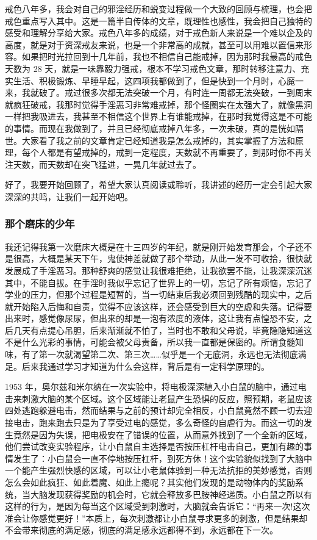 戒色八年多，我会对自己的邪淫经历和蜕变过程做一个大致的回顾与梳理，也会把戒色重点写入其中。这是一篇半自传体的文章，既理性也感性，我会把自己独特的感受和理解分享给大家。戒色八年多的成绩，对于戒色新人来说是一个难以企及的高度，就是对于资深戒友来说，也是一个非常高的成就，甚至可以用难以置信来形容。如果把时光拉回到十几年前，我也不相信自己能戒掉，因为那时我最高的戒色天数为 28 天，就是一味靠毅力强戒，根本不学习戒色文章，那时转移注意力、充实生活、积极锻炼、早睡早起，这四项我都做到了，但是快到一个月时，心魔一来，我就破了。戒过很多次都无法突破一个月，有时连一周都无法突破，一到周末就疯狂破戒，我那时觉得手淫恶习非常难戒掉，那个怪圈实在太强大了，就像黑洞一样把我吸进去，我甚至不相信这个世界上有谁能戒掉，在那时我觉得这是不可能的事情。而现在我做到了，并且已经彻底戒掉八年多，一次未破，真的是恍如隔世。大家看了我之前的文章肯定已经知道我是怎么戒掉的，其实掌握了方法和原理，每个人都是有望戒掉的，戒到一定程度，天数就不再重要了，到那时你不再关注天数，而天数却在突飞猛进，一晃几年就过去了。

好了，我要开始回顾了，希望大家认真阅读或聆听，我讲述的经历一定会引起大家深深的共鸣，让我们一起开始吧。

\subsubsection{那个磨床的少年}

我还记得我第一次磨床大概是在十三四岁的年纪，就是刚开始发育那会，个子还不是很高，大概是某天下午，鬼使神差就做了那个举动，从此一发不可收拾，很快就发展成了手淫恶习。那种舒爽的感觉让我很难拒绝，让我欲罢不能，让我深深沉迷其中，不能自拔。在手淫时我似乎忘记了世界上的一切，忘记了所有烦恼，忘记了学业的压力，但那个过程是短暂的，当一切结束后我必须回到残酷的现实中，之后就开始陷入后悔和自责，觉得不应该这样，还会感受到巨大的空虚和失落。记得要出来时，感觉像尿尿，但出来的却是一泡有浓度的液体，这让我有点惶恐不安，之后几天有点提心吊胆，后来渐渐就不怕了，当时也不敢和父母说，毕竟隐隐知道这不是什么光彩的事情，可能会被父母责备，所以我一直都是保密的。所谓食髓知味，有了第一次就渴望第二次、第三次……似乎是一个无底洞，永远也无法彻底满足。后来我通过学习才知道为什么会这样，背后是有一定科学原理的。

1953 年，奥尔兹和米尔纳在一次实验中，将电极深深植入小白鼠的脑中，通过电击来刺激大脑的某个区域。这个区域能让老鼠产生恐惧的反应，照预期，老鼠应该四处逃跑躲避电击，然而结果与之前的预计却完全相反，小白鼠竟然不顾一切去迎接电击，跑来跑去只是为了享受过电的感觉，多么奇怪的自虐行为。而这一切的发生竟然是因为失误，把电极安在了错误的位置，从而意外找到了一个全新的区域，他们尝试改变实验程序，让小白鼠自主选择是否按压杠杆电击自己，更加有趣的事情发生了：小白鼠会一直不停地按压杠杆，到死方休！这个实验貌似找到了大脑中一个能产生强烈快感的区域，可以让小老鼠体验到一种无法抗拒的美妙感觉，否则怎么会如此疯狂、如此着魔、如此上瘾呢？其实他们发现的是动物体内的奖励系统，当大脑发现获得奖励的机会时，它就会释放多巴胺神经递质。小白鼠之所以有这样的行为，是因为每当这个区域受到刺激时，大脑就会告诉它：“再来一次!这次准会让你感觉更好！”本质上，每次刺激都让小白鼠寻求更多的刺激，但是结果却不会带来彻底的满足感，彻底的满足感永远都得不到，永远都在下一次。

